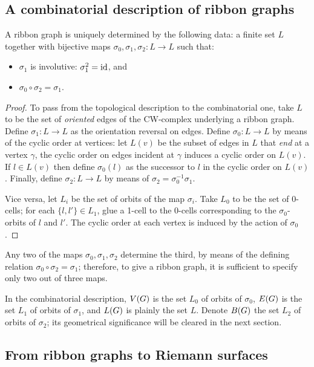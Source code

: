 \subsection{A combinatorial description of ribbon graphs}
\label{sec:rg-comb}

\begin{lemma}
  A ribbon graph is uniquely determined by the following data: a
  finite set $L$ together with bijective maps $\sigma_0, \sigma_1, \sigma_2: L \to L$ such
  that:
  \begin{itemize}
  \item $\sigma_1$ is involutive: $\sigma_1^2 = \operatorname{id}$, and
  \item $\sigma_0 \circ \sigma_2 = \sigma_1$.
  \end{itemize}
\end{lemma}
\begin{proof}
  To pass from the topological description to the combinatorial one,
  take $L$ to be the set of \emph{oriented} edges of the CW-complex
  underlying a ribbon graph.  Define $\sigma_1:L\to L$ as the orientation
  reversal on edges.  Define $\sigma_0:L\to L$ by means of the cyclic order
  at vertices: let $L(v)$ be the subset of edges in $L$ that
  \emph{end} at a vertex $\gamma$, the cyclic order on edges incident at
  $\gamma$ induces a cyclic order on $L(v)$.  If $l\in L(v)$ then define
  $\sigma_0(l)$ as the successor to $l$ in the cyclic order on $L(v)$.
  Finally, define $\sigma_2: L \to L$ by means of $\sigma_2=\sigma_0^{-1}\sigma_1$.

  Vice versa, let $L_i$ be the set of orbits of the map $\sigma_i$.  Take
  $L_0$ to be the set of 0-cells; for each $\{l,l'\} \in L_1$, glue a
  1-cell to the 0-cells corresponding to the $\sigma_0$-orbits of $l$ and
  $l'$.  The cyclic order at each vertex is induced by the action of
  $\sigma_0$.
\end{proof}
Any two of the maps $\sigma_0, \sigma_1, \sigma_2$ determine the third, by means of
the defining relation $\sigma_0 \circ \sigma_2 = \sigma_1$; therefore, to give a ribbon
graph, it is sufficient to specify only two out of three maps.

In the combinatorial description, $V(G)$ is the set $L_0$ of
orbits of $\sigma_0$, $E(G)$ is the set $L_1$ of orbits of $\sigma_1$, and
$L(G)$ is plainly the set $L$.  Denote $B(G)$ the set $L_2$
of orbits of $\sigma_2$; its geometrical significance will be cleared in
the next section.


\subsection{From ribbon graphs to Riemann surfaces}
\label{sec:rg-to-surfaces}

